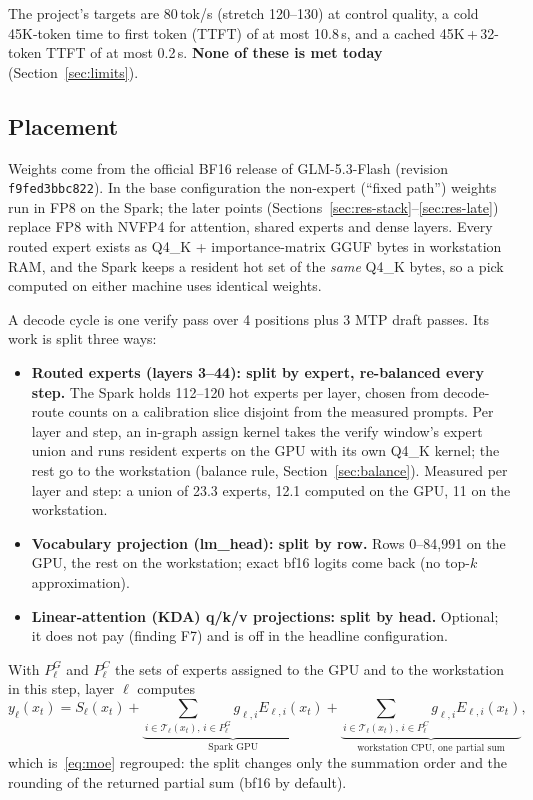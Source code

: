\documentclass[11pt]{article}
\newcommand{\tps}{\,tok/s}
\begin{document}
The project's targets are 80\tps{} (stretch 120--130) at control quality, a cold 45K-token time to first token (TTFT)
of at most 10.8\,s, and a cached 45K\,+\,32-token TTFT of at most 0.2\,s. \textbf{None of these is met today}
(Section~\ref{sec:limits}).

\subsection{Placement}
\label{sec:placement}

Weights come from the official BF16 release of GLM-5.3-Flash (revision \texttt{f9fed3bbc822}). In the base
configuration the non-expert (``fixed path'') weights run in FP8 on the Spark; the later points
(Sections~\ref{sec:res-stack}--\ref{sec:res-late}) replace FP8 with NVFP4 for attention, shared experts and dense
layers. Every routed expert exists as Q4\_K + importance-matrix GGUF bytes in workstation RAM, and the Spark keeps a
resident hot set of the \emph{same} Q4\_K bytes, so a pick computed on either machine uses identical weights.

A decode cycle is one verify pass over 4 positions plus 3 MTP draft passes. Its work is split three ways:
\begin{itemize}
  \item \textbf{Routed experts (layers 3--44): split by expert, re-balanced every step.} The Spark holds 112--120 hot
    experts per layer, chosen from decode-route counts on a calibration slice disjoint from the measured prompts. Per
    layer and step, an in-graph assign kernel takes the verify window's expert union and runs resident experts on the
    GPU with its own Q4\_K kernel; the rest go to the workstation (balance rule, Section~\ref{sec:balance}). Measured per
    layer and step: a union of 23.3 experts, 12.1 computed on the GPU, 11 on the workstation.
  \item \textbf{Vocabulary projection (lm\_head): split by row.} Rows 0--84,991 on the GPU, the rest on the
    workstation; exact bf16 logits come back (no top-$k$ approximation).
  \item \textbf{Linear-attention (KDA) q/k/v projections: split by head.} Optional; it does not pay (finding F7) and is
    off in the headline configuration.
\end{itemize}
With $P^{G}_\ell$ and $P^{C}_\ell$ the sets of experts assigned to the GPU and to the workstation in this step, layer
$\ell$ computes
\begin{equation}
  y_\ell(x_t) = S_\ell(x_t) + \underbrace{\sum_{i\in\mathcal{T}_\ell(x_t),\, i\in P^{G}_\ell} g_{\ell,i}E_{\ell,i}(x_t)}_{\text{Spark GPU}}
  + \underbrace{\sum_{i\in\mathcal{T}_\ell(x_t),\, i\in P^{C}_\ell} g_{\ell,i}E_{\ell,i}(x_t)}_{\text{workstation CPU, one partial sum}},
  \label{eq:split}
\end{equation}
which is~\eqref{eq:moe} regrouped: the split changes only the summation order and the rounding of the returned partial
sum (bf16 by default).
\end{document}
